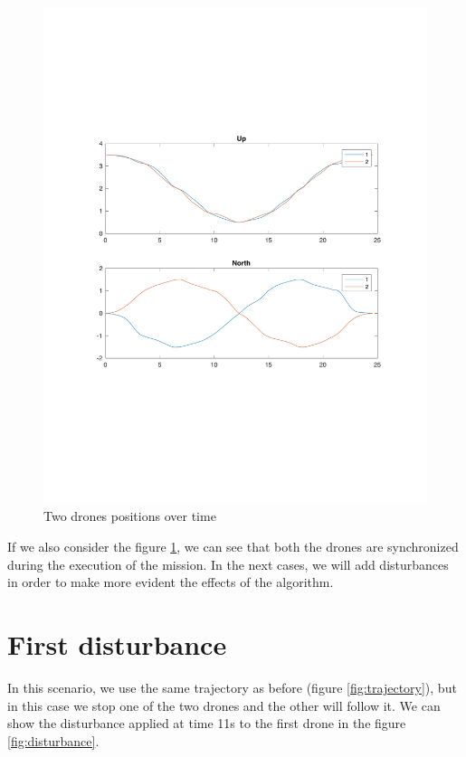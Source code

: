 \begin{figure}[h]
\centering
\includegraphics[width=1.0\textwidth]{chapters/chapter-04/figures/overlapped.pdf}
\caption{Two drones positions over time}
\label{fig:overlapped}
\end{figure}

If we also consider the figure \ref{fig:overlapped}, we can see that both the drones
are synchronized during the execution of the mission. In the next cases, we will
add disturbances in order to make more evident the effects of the algorithm.


\section{First disturbance}
In this scenario, we use the same trajectory as before (figure \ref{fig:trajectory}),
but in this case we stop one of the two drones and the other will follow it.
We can show the disturbance applied at time 11s to the first drone in the figure \ref{fig:disturbance}.

